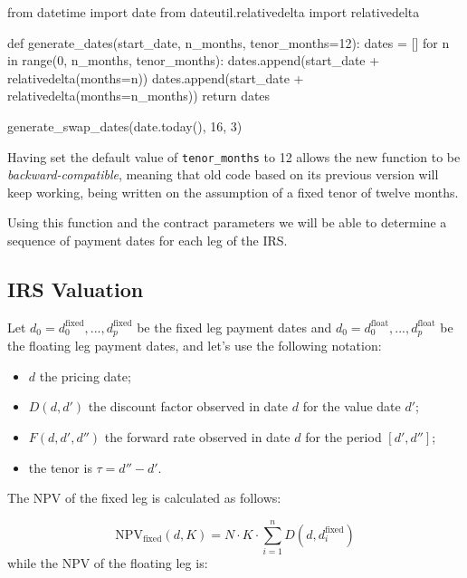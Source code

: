 \begin{ipython}
from datetime import date
from dateutil.relativedelta import relativedelta

def generate_dates(start_date, n_months, tenor_months=12):
    dates = []
    for n in range(0, n_months, tenor_months):
        dates.append(start_date + relativedelta(months=n))
    dates.append(start_date + relativedelta(months=n_months))
    return dates
    
generate_swap_dates(date.today(), 16, 3)
\end{ipython}
\begin{ioutput}
\end{ioutput}
Having set the default value of \texttt{tenor\_months} to 12 allows the new function to be \emph{backward-compatible}, meaning that old code based on its previous version will keep working, being written on the assumption of a fixed tenor of twelve months. 
       
Using this function and the contract parameters we will be able to determine a sequence of payment dates for each leg of the IRS.

\subsection{IRS Valuation}
\label{irs-valuation}

Let \(d_0=d_0^{\mathrm{fixed}},...,d_p^{\mathrm{fixed}}\) be the fixed leg payment dates and \(d_0=d_0^{\mathrm{float}},...,d_p^{\mathrm{float}}\) be the floating leg payment dates, and let's use the following notation:

\begin{itemize}
\tightlist
\item
  \(d\) the pricing date;
\item
  \(D(d, d')\) the discount factor observed in date \(d\) for the value
  date \(d'\);
\item
  \(F(d, d', d'')\) the forward rate observed in date \(d\) for the
  period \([d', d'']\); 
  \item the tenor is \(\tau = d'' - d'\).
\end{itemize}
The NPV of the fixed leg is calculated as follows:

\begin{equation}
\mathrm{NPV}_{\mathrm{fixed}}(d, K) = N\cdot K\cdot\sum_{i=1}^{n}D(d, d_{i}^{\mathrm{fixed}})\end{equation}
while the NPV of the floating leg is:

